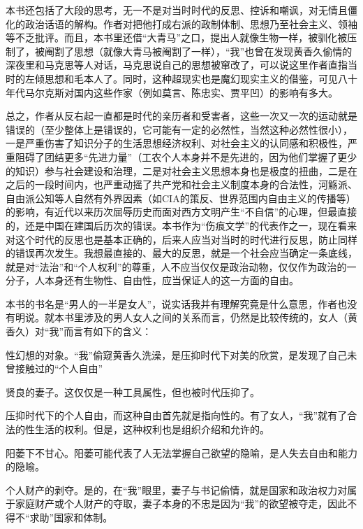 本书还包括了大段的思考，无一不是对当时时代的反思、控诉和嘲讽，对无情且僵化的政治话语的解构。作者对把他打成右派的政制体制、思想乃至社会主义、领袖等不乏批评。而且，本书里还借“大青马”之口，提出人就像生物一样，被驯化被压制了，被阉割了思想（就像大青马被阉割了一样），“我”也曾在发现黄香久偷情的深夜里和马克思等人对话，马克思说自己的思想被窜改了，可以说这里作者直指当时的左倾思想和毛本人了。同时，这种超现实也是魔幻现实主义的借鉴，可见八十年代马尔克斯对国内这些作家（例如莫言、陈忠实、贾平凹）的影响有多大。

总之，作者从反右起一直都是时代的亲历者和受害者，这些一次又一次的运动就是错误的（至少整体上是错误的，它可能有一定的必然性，当然这种必然性很小），一是严重伤害了知识分子的生活思想经济权利、对社会主义的认同感和积极性，严重阻碍了团结更多“先进力量”（工农个人本身并不是先进的，因为他们掌握了更少的知识）参与社会建设和治理，二是对社会主义思想本身也是极度的扭曲，二是在之后的一段时间内，也严重动摇了共产党和社会主义制度本身的合法性，河觞派、自由派公知等人自然有外界因素（如CIA的策反、世界范围内自由主义的传播等）的影响，有近代以来历次屈辱历史而面对西方文明产生“不自信”的心理，但最直接的，还是中国在建国后历次的错误。本书作为“伤痕文学”的代表作之一，现在看来对这个时代的反思也是基本正确的，后来人应当对当时的时代进行反思，防止同样的错误再次发生。我想最直接的、最大的反思，就是一个社会应当确定一条底线，就是对“法治”和“个人权利”的尊重，人不应当仅仅是政治动物，仅仅作为政治的一分子，人本身还有生物性、自由性，应当保证人的这一方面的自由。

本书的书名是“男人的一半是女人”，说实话我并有理解究竟是什么意思，作者也没有明说。就本书里涉及的男人女人之间的关系而言，仍然是比较传统的，女人（黄香久）对“我”而言有如下的含义：
\begin{itemize*}
    \item 性幻想的对象。“我”偷窥黄香久洗澡，是压抑时代下对美的欣赏，是发现了自己未曾接触过的“个人自由”
    \item 贤良的妻子。这仅仅是一种工具属性，但也被时代压抑了。
    \item 压抑时代下的个人自由，而这种自由首先就是指向性的。有了女人，“我”就有了合法的性生活的权利。但是，这种权利也是组织介绍和允许的。
    \item 阳萎下不甘心。阳萎可能代表了人无法掌握自己欲望的隐喻，是人失去自由和能力的隐喻。
    \item 个人财产的剥夺。是的，在“我”眼里，妻子与书记偷情，就是国家和政治权力对属于家庭财产或个人财产的夺取，妻子本身的不忠是因为“我”的欲望被夺走，因此不得不“求助”国家和体制。
\end{itemize*}

